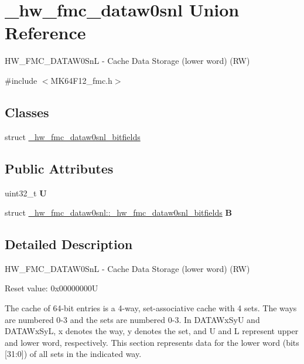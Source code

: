 \hypertarget{union__hw__fmc__dataw0snl}{}\section{\+\_\+hw\+\_\+fmc\+\_\+dataw0snl Union Reference}
\label{union__hw__fmc__dataw0snl}


H\+W\+\_\+\+F\+M\+C\+\_\+\+D\+A\+T\+A\+W0\+SnL -\/ Cache Data Storage (lower word) (RW)  




{\ttfamily \#include $<$M\+K64\+F12\+\_\+fmc.\+h$>$}

\subsection*{Classes}
\begin{DoxyCompactItemize}
\item 
struct \hyperlink{struct__hw__fmc__dataw0snl_1_1__hw__fmc__dataw0snl__bitfields}{\+\_\+hw\+\_\+fmc\+\_\+dataw0snl\+\_\+bitfields}
\end{DoxyCompactItemize}
\subsection*{Public Attributes}
\begin{DoxyCompactItemize}
\item 
uint32\+\_\+t {\bfseries U}\hypertarget{union__hw__fmc__dataw0snl_a4904a0164c655a75710b3575d20690fe}{}\label{union__hw__fmc__dataw0snl_a4904a0164c655a75710b3575d20690fe}

\item 
struct \hyperlink{struct__hw__fmc__dataw0snl_1_1__hw__fmc__dataw0snl__bitfields}{\+\_\+hw\+\_\+fmc\+\_\+dataw0snl\+::\+\_\+hw\+\_\+fmc\+\_\+dataw0snl\+\_\+bitfields} {\bfseries B}\hypertarget{union__hw__fmc__dataw0snl_ad4a569695eab50d37af6b78466d0930f}{}\label{union__hw__fmc__dataw0snl_ad4a569695eab50d37af6b78466d0930f}

\end{DoxyCompactItemize}


\subsection{Detailed Description}
H\+W\+\_\+\+F\+M\+C\+\_\+\+D\+A\+T\+A\+W0\+SnL -\/ Cache Data Storage (lower word) (RW) 

Reset value\+: 0x00000000U

The cache of 64-\/bit entries is a 4-\/way, set-\/associative cache with 4 sets. The ways are numbered 0-\/3 and the sets are numbered 0-\/3. In D\+A\+T\+A\+Wx\+SyU and D\+A\+T\+A\+Wx\+SyL, x denotes the way, y denotes the set, and U and L represent upper and lower word, respectively. This section represents data for the lower word (bits \mbox{[}31\+:0\mbox{]}) of all sets in the indicated way. 

